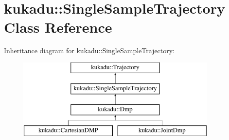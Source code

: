 \hypertarget{classkukadu_1_1SingleSampleTrajectory}{\section{kukadu\-:\-:Single\-Sample\-Trajectory Class Reference}
\label{classkukadu_1_1SingleSampleTrajectory}
}
Inheritance diagram for kukadu\-:\-:Single\-Sample\-Trajectory\-:\begin{figure}[H]
\begin{center}
\leavevmode
\includegraphics[height=4.000000cm]{classkukadu_1_1SingleSampleTrajectory}
\end{center}
\end{figure}
